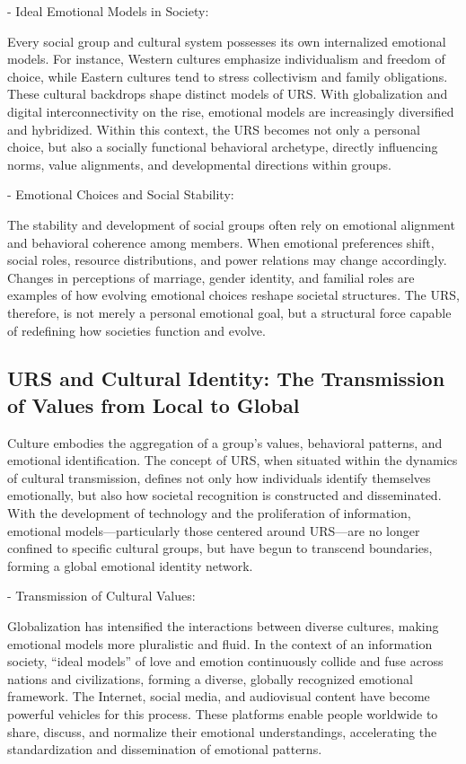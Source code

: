 \documentclass{article}
\begin{document}
- Ideal Emotional Models in Society: 

Every social group and cultural system possesses its own internalized emotional models. For instance, Western cultures emphasize individualism and freedom of choice, while Eastern cultures tend to stress collectivism and family obligations. These cultural backdrops shape distinct models of URS. With globalization and digital interconnectivity on the rise, emotional models are increasingly diversified and hybridized. Within this context, the URS becomes not only a personal choice, but also a socially functional behavioral archetype, directly influencing norms, value alignments, and developmental directions within groups.

- Emotional Choices and Social Stability:

The stability and development of social groups often rely on emotional alignment and behavioral coherence among members. When emotional preferences shift, social roles, resource distributions, and power relations may change accordingly. Changes in perceptions of marriage, gender identity, and familial roles are examples of how evolving emotional choices reshape societal structures. The URS, therefore, is not merely a personal emotional goal, but a structural force capable of redefining how societies function and evolve.

\subsection{URS and Cultural Identity: The Transmission of Values from Local to Global}

Culture embodies the aggregation of a group’s values, behavioral patterns, and emotional identification. The concept of URS, when situated within the dynamics of cultural transmission, defines not only how individuals identify themselves emotionally, but also how societal recognition is constructed and disseminated. With the development of technology and the proliferation of information, emotional models—particularly those centered around URS—are no longer confined to specific cultural groups, but have begun to transcend boundaries, forming a global emotional identity network.

- Transmission of Cultural Values:

Globalization has intensified the interactions between diverse cultures, making emotional models more pluralistic and fluid. In the context of an information society, “ideal models” of love and emotion continuously collide and fuse across nations and civilizations, forming a diverse, globally recognized emotional framework. The Internet, social media, and audiovisual content have become powerful vehicles for this process. These platforms enable people worldwide to share, discuss, and normalize their emotional understandings, accelerating the standardization and dissemination of emotional patterns.
\end{document}
